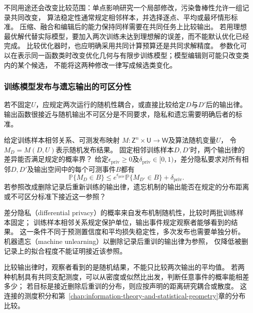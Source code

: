 不同用途还会改变比较范围：单点影响研究一个局部修改，污染鲁棒性允许一组记录共同改变，
算法稳定性通常规定相邻样本，并选择逐点、平均或最坏情形标准。
压缩、融合和编辑后的能力保持同样需要在共同任务上比较输出。
若用理想最优解代替实际模型，要加入两次训练未达到理想解的误差，而不能默认优化已经完成。
比较优化器时，也应明确采用共同计算预算还是共同求解精度。
参数化可以在表示同一函数类时改变优化几何与有限步训练模型；模型编辑则可能只改变类内的某个候选，
不能将这两种修改一律写成候选类变化。

\subsubsection{训练模型发布与遗忘输出的可区分性}
\label{sec:future-analysis-output-law}

若不固定$U$，应规定两次运行的随机性耦合，或直接比较给定$D$与$D'$后的输出律。
输出函数很接近与随机输出不可区分是不同要求，隐私和遗忘需要明确后者的标准。

\begin{mathproblem}[随机输出律的可区分程度]
  \label{question:future-output-law}
  给定训练样本相邻关系、可测发布映射
  $M:\mathsf Z^n\times\mathsf U\to\mathsf W$及算法随机变量$U$，
  令$M_D=M(D,U)$表示随机发布结果。
  固定相邻训练样本$D,D'$时，两个输出律的差异能否满足规定的概率界？
  给定$\epsilon_{\mathrm{priv}}\geq0$及$\delta_{\mathrm{priv}}\in[0,1)$，差分隐私要求对所有相邻$D,D'$及输出空间中的每个可测事件$B$都有
  \[
    \mathbb P\{M_D\in B\}
    \leq e^{\epsilon_{\mathrm{priv}}}
       \mathbb P\{M_{D'}\in B\}+\delta_{\mathrm{priv}}.
  \]
  若参照改成删除记录后重新训练的输出律，遗忘机制的输出能否在规定的分布距离
  或不可区分标准下接近这一参照？
\end{mathproblem}

差分隐私（differential privacy）的概率来自发布机制随机性，比较时两批训练样本固定；
训练样本相邻关系规定保护单位，输出事件规定观察者能够看到的结果。
这一条件不同于预测置信度和平均损失稳定性，多次发布也需要单独分析。
机器遗忘（machine unlearning）以删除记录后重训的输出律为参照，
仅降低被删记录上的拟合程度不能证明接近该参照。

比较输出律时，观察者看到的是随机结果，不能只比较两次输出的平均值。
若两种机制具有共同支配测度，可以从密度或似然比出发，判断任意事件的概率能相差多少；
若目标是接近删除后重训的分布，则应按声明的距离研究耦合或散度。
这连接的测度积分和第~\ref{chap:information-theory-and-statistical-geometry}章的分布比较。

